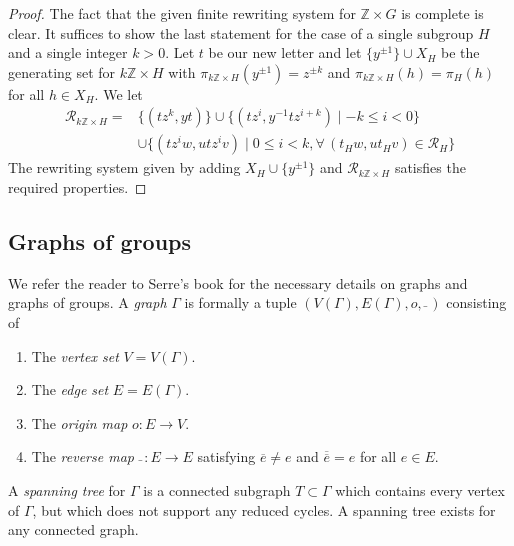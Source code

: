 \documentclass[12pt, a4paper]{amsart}
\theoremstyle{definition}
\newcommand{\Z}{\mathbb{Z}}
\begin{document}
\begin{proof}
The fact that the given finite rewriting system for $\Z\times G$ is complete is clear. It suffices to show the last statement for the case of a single subgroup $H$ and a single integer $k> 0$. Let $t$ be our new letter and let $\{y^{\pm1}\}\cup X_H$ be the generating set for $k\Z\times H$ with $\pi_{k\Z\times H}(y^{\pm1}) = z^{\pm k}$ and $\pi_{k\Z\times H}(h) = \pi_H(h)$ for all $h\in X_H$. We let
\begin{align*}
\mathcal{R}_{k\Z\times H} = &\{(tz^{k}, yt)\}\cup \{(tz^i, y^{-1}tz^{i+k}) \mid -k\leqslant i<0\}\\
						&\cup \{(tz^iw, utz^iv)\mid 0\leqslant i<k, \forall\, (t_Hw, ut_Hv)\in \mathcal{R}_H\}
\end{align*}
The rewriting system given by adding $X_H\cup\{y^{\pm1}\}$ and $\mathcal{R}_{k\Z\times H}$ satisfies the required properties.
\end{proof}


\subsection{Graphs of groups}

We refer the reader to Serre's book \cite{Serre} for the necessary details on graphs and graphs of groups. A \emph{graph} $\Gamma$ is formally a tuple $(V(\Gamma), E(\Gamma), o, \bar{ }\,)$ consisting of
\begin{enumerate}
\item The \emph{vertex set} $V = V(\Gamma)$.
\item The \emph{edge set} $E = E(\Gamma)$.
\item The \emph{origin map} $o\colon E\to V$.
\item The \emph{reverse map} $\bar{ }\,\colon E\to E$ satisfying $\overline{e}\neq e$ and $\overline{\overline{e}} = e$ for all $e\in E$.
\end{enumerate}
A \emph{spanning tree} for $\Gamma$ is a connected subgraph $T\subset \Gamma$ which contains every vertex of $\Gamma$, but which does not support any reduced cycles. A spanning tree exists for any connected graph.
\end{document}
